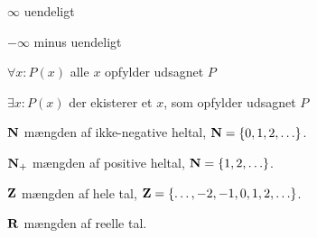 \begin{mydescription}
\item[$\infty$] uendeligt

\item[$-\infty$] minus uendeligt

\item[$\forall x\colon P(x)$] alle $x$ opfylder udsagnet $P$ 

\item[$\exists x\colon P(x)$] der ekisterer et $x$, som opfylder udsagnet $P$ 

\item[$\mathbf N$] mængden af ikke-negative heltal, $\mathbf N= \{0,1,2,\ldots\}$.

\item[$\mathbf N_+$] mængden af positive heltal, $\mathbf N= \{1,2,\ldots\}$.

\item[$\mathbf Z$] mængden af hele tal, $\mathbf Z= \{\ldots, -2,-1,0,1,2,\ldots\}$.

\item[$\mathbf R$] mængden af reelle tal.


\end{mydescription}
